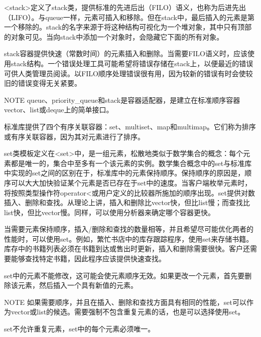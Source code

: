 
<stack>定义了stack类，提供标准的先进后出（FILO）语义，也称为后进先出（LIFO）。与queue一样，元素可插入和移除。但在stack中，最后插入的元素是第一个移除的。stack的名字来源于将这种结构可视化为一个堆对象，其中只有顶部的对象可见。当向stack中添加一个对象时，会隐藏它下面的所有对象。

stack容器提供快速（常数时间）的元素插入和删除。当需要FILO语义时，应该使用stack结构。一个错误处理工具可能希望将错误存储在stack上，以便最近的错误可供人类管理员阅读。以FILO顺序处理错误很有用，因为较新的错误有时会使较旧的错误变得无关紧要。

\begin{myNotic}{NOTE}
queue、priority\_queue和stack是容器适配器，是建立在标准顺序容器vector、list或deque上的简单接口。
\end{myNotic}


标准库提供了四个有序关联容器：set、multiset、map和multimap。它们称为排序或有序关联容器，因为其对元素进行了排序。


set类模板定义在<set>中，是一组元素，松散地类似于数学集合的概念：每个元素都是唯一的，集合中至多有一个该元素的实例。数学集合概念中的set与标准库中实现的set之间的区别在于，标准库中的元素保持顺序。保持顺序的原因是，顺序可以大大加快验证某个元素是否已存在于set中的速度。当客户端枚举元素时，将按照类型操作符operator<或用户定义的比较器所施加的顺序出现。set提供对数插入、删除和查找。从理论上讲，插入和删除比vector快，但比list慢；而查找比list快，但比vector慢。同样，可以使用分析器来确定哪个容器更快。

当需要元素保持顺序，插入/删除和查找的数量相等，并且希望尽可能优化两者的性能时，可以使用set。例如，繁忙书店中的库存跟踪程序，使用set来存储书籍。库存中的书籍列表必须在书籍到达或售出时更新，插入和删除需要很快。客户还需要能够查找特定书籍，因此程序应该提供快速查找。

set中的元素不能修改，这可能会使元素顺序无效。如果更改一个元素，首先要删除该元素，然后插入一个具有新值的元素。

\begin{myNotic}{NOTE}
如果需要顺序，并且在插入、删除和查找方面具有相同的性能，set可以作为vector或list的候选。需要强制不包含重复元素的话，也是可以选择使用set。
\end{myNotic}

set不允许重复元素，set中的每个元素必须唯一。


